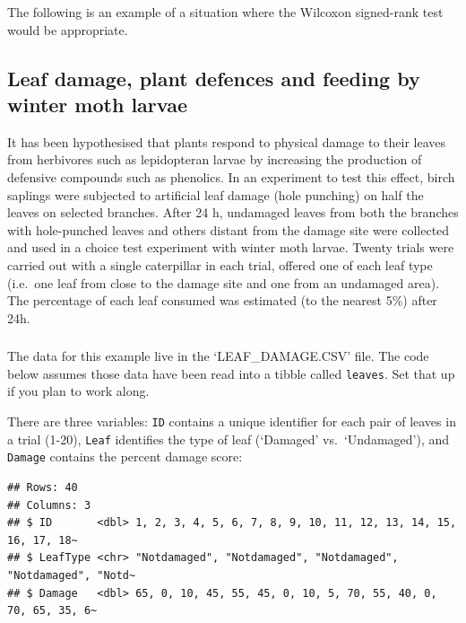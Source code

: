 \documentclass[
]{book}
\newenvironment{greybox}{
  \definecolor{shadecolor}{rgb}{0.95,0.95,0.95}  %
  \color{black}
  \begin{shaded}}
 {\end{shaded}}
\newenvironment{infobox}[1]
  {
  \begin{itemize}
  \renewcommand{\labelitemi}{
    \raisebox{-.7\height}[0pt][0pt]{
      {\setkeys{Gin}{width=3em,keepaspectratio}
        \texttt{[image: images/\#1]}}
    }
  }
  \setlength{\fboxsep}{1em}
  \begin{greybox}
  \item
  }
  {
  \end{greybox}
  \end{itemize}
  }
\begin{document}
The following is an example of a situation where the Wilcoxon signed-rank test would be appropriate.

\hypertarget{leaf-damage-plant-defences-and-feeding-by-winter-moth-larvae}{%
\subsection{Leaf damage, plant defences and feeding by winter moth larvae}\label{leaf-damage-plant-defences-and-feeding-by-winter-moth-larvae}}

It has been hypothesised that plants respond to physical damage to their leaves from herbivores such as lepidopteran larvae by increasing the production of defensive compounds such as phenolics. In an experiment to test this effect, birch saplings were subjected to artificial leaf damage (hole punching) on half the leaves on selected branches. After 24 h, undamaged leaves from both the branches with hole-punched leaves and others distant from the damage site were collected and used in a choice test experiment with winter moth larvae. Twenty trials were carried out with a single caterpillar in each trial, offered one of each leaf type (i.e.~one leaf from close to the damage site and one from an undamaged area). The percentage of each leaf consumed was estimated (to the nearest 5\%) after 24h.

\begin{infobox}{action}

\hypertarget{section-20}{%
\subsubsection*{}\label{section-20}}

The data for this example live in the `LEAF\_DAMAGE.CSV' file. The code below assumes those data have been read into a tibble called \texttt{leaves}. Set that up if you plan to work along.

\end{infobox}

There are three variables: \texttt{ID} contains a unique identifier for each pair of leaves in a trial (1-20), \texttt{Leaf} identifies the type of leaf (`Damaged' vs.~`Undamaged'), and \texttt{Damage} contains the percent damage score:

\begin{verbatim}
## Rows: 40
## Columns: 3
## $ ID       <dbl> 1, 2, 3, 4, 5, 6, 7, 8, 9, 10, 11, 12, 13, 14, 15, 16, 17, 18~
## $ LeafType <chr> "Notdamaged", "Notdamaged", "Notdamaged", "Notdamaged", "Notd~
## $ Damage   <dbl> 65, 0, 10, 45, 55, 45, 0, 10, 5, 70, 55, 40, 0, 70, 65, 35, 6~
\end{verbatim}
\end{document}
